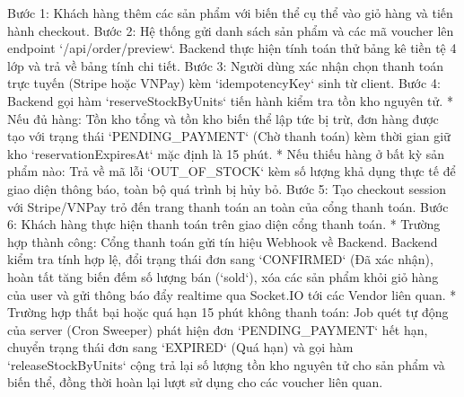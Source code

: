 \documentclass[../DoAn.tex]{subfiles}
\begin{document}
Bước 1: Khách hàng thêm các sản phẩm với biến thể cụ thể vào giỏ hàng và tiến hành checkout.
Bước 2: Hệ thống gửi danh sách sản phẩm và các mã voucher lên endpoint `/api/order/preview`. Backend thực hiện tính toán thử bảng kê tiền tệ 4 lớp và trả về bảng tính chi tiết.
Bước 3: Người dùng xác nhận chọn thanh toán trực tuyến (Stripe hoặc VNPay) kèm `idempotencyKey` sinh từ client.
Bước 4: Backend gọi hàm `reserveStockByUnits` tiến hành kiểm tra tồn kho nguyên tử. 
* Nếu đủ hàng: Tồn kho tổng và tồn kho biến thể lập tức bị trừ, đơn hàng được tạo với trạng thái `PENDING_PAYMENT` (Chờ thanh toán) kèm thời gian giữ kho `reservationExpiresAt` mặc định là 15 phút.
* Nếu thiếu hàng ở bất kỳ sản phẩm nào: Trả về mã lỗi `OUT_OF_STOCK` kèm số lượng khả dụng thực tế để giao diện thông báo, toàn bộ quá trình bị hủy bỏ.
Bước 5: Tạo checkout session với Stripe/VNPay trỏ đến trang thanh toán an toàn của cổng thanh toán.
Bước 6: Khách hàng thực hiện thanh toán trên giao diện cổng thanh toán.
* Trường hợp thành công: Cổng thanh toán gửi tín hiệu Webhook về Backend. Backend kiểm tra tính hợp lệ, đổi trạng thái đơn sang `CONFIRMED` (Đã xác nhận), hoàn tất tăng biến đếm số lượng bán (`sold`), xóa các sản phẩm khỏi giỏ hàng của user và gửi thông báo đẩy realtime qua Socket.IO tới các Vendor liên quan.
* Trường hợp thất bại hoặc quá hạn 15 phút không thanh toán: Job quét tự động của server (Cron Sweeper) phát hiện đơn `PENDING_PAYMENT` hết hạn, chuyển trạng thái đơn sang `EXPIRED` (Quá hạn) và gọi hàm `releaseStockByUnits` cộng trả lại số lượng tồn kho nguyên tử cho sản phẩm và biến thể, đồng thời hoàn lại lượt sử dụng cho các voucher liên quan.
\end{document}
